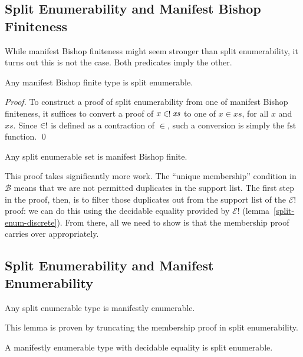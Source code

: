 \subsection{Split Enumerability and Manifest Bishop Finiteness}
While manifest Bishop finiteness might seem stronger than split enumerability,
it turns out this is not the case.
Both predicates imply the other.
\begin{romlemma} \label{manifest-bishop-to-split-enum}
  Any manifest Bishop finite type is split enumerable.
\end{romlemma}
\begin{proof}
  To construct a proof of split enumerability from one of manifest Bishop
  finiteness, it suffices to convert a proof of \(x \inunique \mathit{xs}\) to
  one of \(x \in \mathit{xs}\), for all \(x\) and \(\mathit{xs}\).
  Since \(\inunique\) is defined as a contraction of \(\in\), such a conversion
  is simply the \(\text{fst}\) function.
  \qed
\end{proof}

\begin{romlemma} \label{split-enum-to-manifest-bishop}
  Any split enumerable set is manifest Bishop finite.
\end{romlemma}
This proof takes significantly more work.
The ``unique membership'' condition in \(\mathcal{B}\) means that we are not
permitted duplicates in the support list.
The first step in the proof, then, is to filter those duplicates out from the
support list of the \(\mathcal{E}!\) proof: we can do this using the decidable
equality provided by \(\mathcal{E}!\) (lemma~\ref{split-enum-discrete}).
From there, all we need to show is that the membership proof carries over
appropriately.
\subsection{Split Enumerability and Manifest Enumerability}
\begin{romlemma} \label{split-enum-to-manifest-enum}
  Any split enumerable type is manifestly enumerable.
\end{romlemma}
This lemma is proven by truncating the membership proof in split enumerability.

\begin{romlemma} \label{manifest-enum-to-split-enum}
  A manifestly enumerable type with decidable equality is split enumerable.
\end{romlemma}

